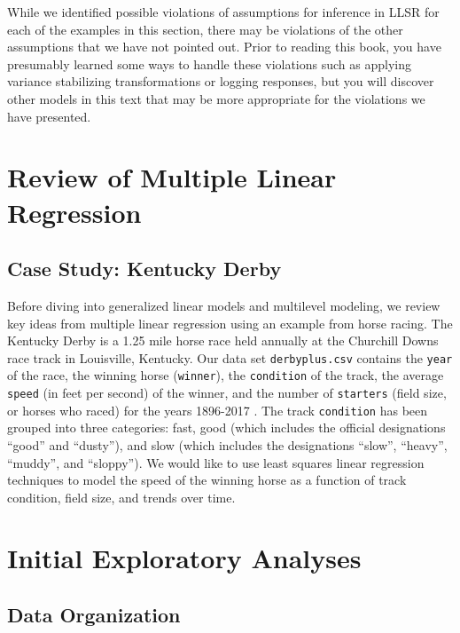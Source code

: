 \documentclass[
]{krantz}
\begin{document}
While we identified possible violations of assumptions for inference in LLSR for each of the examples in this section, there may be violations of the other assumptions that we have not pointed out. Prior to reading this book, you have presumably learned some ways to handle these violations such as applying variance stabilizing transformations or logging responses, but you will discover other models in this text that may be more appropriate for the violations we have presented.

\hypertarget{review-of-multiple-linear-regression}{%
\section{Review of Multiple Linear Regression}\label{review-of-multiple-linear-regression}}

\hypertarget{cs:derby}{%
\subsection{Case Study: Kentucky Derby}\label{cs:derby}}

Before diving into generalized linear models and multilevel modeling, we review key ideas from multiple linear regression using an example from horse racing. The Kentucky Derby is a 1.25 mile horse race held annually at the Churchill Downs race track in Louisville, Kentucky. Our data set \texttt{derbyplus.csv} contains the \texttt{year} of the race, the winning horse (\texttt{winner}), the \texttt{condition} of the track, the average \texttt{speed} (in feet per second) of the winner, and the number of \texttt{starters} (field size, or horses who raced) for the years 1896-2017 \citep{KentuckyDerby}. The track \texttt{condition} has been grouped into three categories: fast, good (which includes the official designations ``good'' and ``dusty''), and slow (which includes the designations ``slow'', ``heavy'', ``muddy'', and ``sloppy''). We would like to use least squares linear regression techniques to model the speed of the winning horse as a function of track condition, field size, and trends over time.

\hypertarget{explorech1}{%
\section{Initial Exploratory Analyses}\label{explorech1}}

\hypertarget{data-organization}{%
\subsection{Data Organization}\label{data-organization}}
\end{document}

